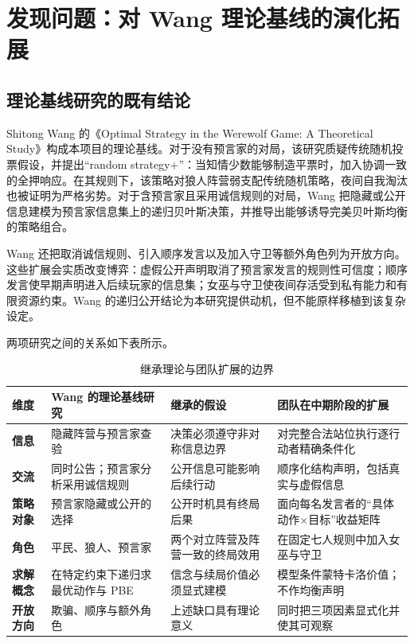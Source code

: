 \documentclass[UTF8,11pt,a4paper,fontset=windows]{ctexart}
\begin{document}
\section{发现问题：对 Wang 理论基线的演化拓展}

\subsection{理论基线研究的既有结论}

Shitong Wang 的《Optimal Strategy in the Werewolf Game: A Theoretical Study》构成本项目的理论基线\cite{wang2025}。对于没有预言家的对局，该研究质疑传统随机投票假设，并提出“random strategy+”：当知情少数能够制造平票时，加入协调一致的全押响应。在其规则下，该策略对狼人阵营弱支配传统随机策略，夜间自我淘汰也被证明为严格劣势。对于含预言家且采用诚信规则的对局，Wang 把隐藏或公开信息建模为预言家信息集上的递归贝叶斯决策，并推导出能够诱导完美贝叶斯均衡的策略组合。

Wang 还把取消诚信规则、引入顺序发言以及加入守卫等额外角色列为开放方向。这些扩展会实质改变博弈：虚假公开声明取消了预言家发言的规则性可信度；顺序发言使早期声明进入后续玩家的信息集；女巫与守卫使夜间存活受到私有能力和有限资源约束。Wang 的递归公开结论为本研究提供动机，但不能原样移植到该复杂设定。

两项研究之间的关系如下表所示。

\begin{table}[htbp]
\centering
\caption{继承理论与团队扩展的边界}
\begin{tabularx}{\textwidth}{>{\bfseries}p{}YYY}
\toprule
维度 & Wang 的理论基线研究 & 继承的假设 & 团队在中期阶段的扩展 \\
\midrule
信息 & 隐藏阵营与预言家查验 & 决策必须遵守非对称信息边界 & 对完整合法站位执行逐行动者精确条件化 \\
交流 & 同时公告；预言家分析采用诚信规则 & 公开信息可能影响后续行动 & 顺序化结构声明，包括真实与虚假信息 \\
策略对象 & 预言家隐藏或公开的选择 & 公开时机具有终局后果 & 面向每名发言者的“具体动作×目标”收益矩阵 \\
角色 & 平民、狼人、预言家 & 两个对立阵营及阵营一致的终局效用 & 在固定七人规则中加入女巫与守卫 \\
求解概念 & 在特定约束下递归求最优动作与 PBE & 信念与续局价值必须显式建模 & 模型条件蒙特卡洛价值；不作均衡声明 \\
开放方向 & 欺骗、顺序与额外角色 & 上述缺口具有理论意义 & 同时把三项因素显式化并使其可观察 \\
\bottomrule
\end{tabularx}
\end{table}
\end{document}
